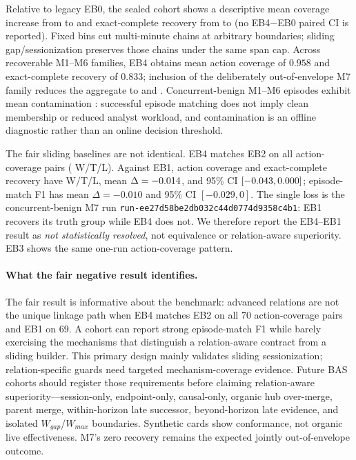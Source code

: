 

Relative to legacy EB0, the sealed cohort shows a descriptive mean coverage increase from
\EbZeroCov{} to \TeCov{} and exact-complete recovery from \EbZeroExact{} to \TeExact{} (no EB4$-$EB0
paired CI is reported). Fixed bins cut multi-minute chains at arbitrary boundaries; sliding
gap/sessionization preserves those chains under the same span cap. Across recoverable M1--M6
families, EB4 obtains mean action coverage of $0.958$ and exact-complete recovery of $0.833$;
inclusion of the deliberately out-of-envelope M7 family reduces the aggregate to \TeCov{} and
\TeExact{}. Concurrent-benign M1--M6 episodes exhibit mean contamination \ConcConcurrent{}: successful
episode matching does not imply clean membership or reduced analyst workload, and contamination is an
offline diagnostic rather than an online decision threshold.



The fair sliding baselines are not identical. EB4 matches EB2 on all action-coverage pairs
(\EbTwoActionWTL{} W/T/L). Against EB1, action coverage and exact-complete recovery have
\EbOneActionWTL{} W/T/L, mean $\Delta=-0.014{}$, and 95\% CI
$[-0.043{},0.000{}]$; episode-match F1 has mean $\Delta=-0.010$ and 95\% CI
$[-0.029,0]$. The single loss is the concurrent-benign M7 run
\texttt{run-ee27d58be2db032c44d0774d9358c4b1}: EB1 recovers its truth group while EB4 does not.
We therefore report the EB4--EB1 result as \emph{not statistically resolved}, not equivalence or
relation-aware superiority. EB3 shows the same one-run action-coverage pattern.

\paragraph{What the fair negative result identifies.}
The fair result is informative about the benchmark: advanced relations are not the unique linkage
path when EB4 matches EB2 on all 70 action-coverage pairs and EB1 on 69. A cohort can report strong
episode-match F1 while barely exercising the mechanisms that distinguish a relation-aware contract
from a sliding builder. This primary design mainly validates sliding sessionization; relation-specific
guards need targeted mechanism-coverage evidence. Future BAS cohorts should register those
requirements before claiming relation-aware superiority---session-only, endpoint-only, causal-only,
organic hub over-merge, parent merge, within-horizon late successor, beyond-horizon late evidence, and
isolated $W_{gap}$/$W_{max}$ boundaries. Synthetic cards show conformance, not organic live
effectiveness. M7's zero recovery remains the expected jointly out-of-envelope outcome.

